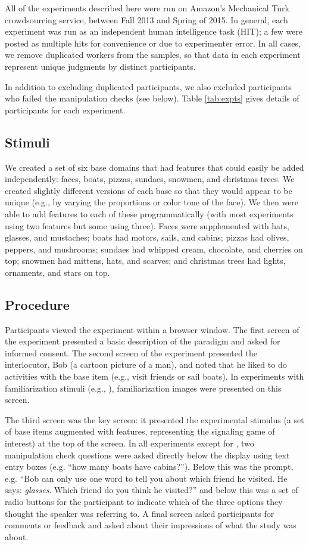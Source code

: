 All of the experiments described here were run on Amazon's Mechanical Turk crowdsourcing service, between Fall 2013 and Spring of 2015. In general, each experiment was run as an independent human intelligence task (HIT); a few were posted as multiple hits for convenience or due to experimenter error. In all cases, we remove duplicated workers from the samples, so that data in each experiment represent unique judgments by distinct participants. 

In addition to excluding duplicated participants, we also excluded participants who failed the manipulation checks (see below). Table \ref{tab:expts} gives details of participants for each experiment. 

\subsection{Stimuli}

We created a set of six base domains that had features that could easily be added independently: faces, boats, pizzas, sundaes, snowmen, and christmas trees. We created slightly different versions of each base so that they would appear to be unique (e.g., by varying the proportions or color tone of the face). We then were able to add features to each of these programmatically (with most experiments using two features but some using three). Faces were supplemented with hats, glasses, and mustaches; boats had motors, sails, and cabins; pizzas had olives, peppers, and mushrooms; sundaes had whipped cream, chocolate, and cherries on top; snowmen had mittens, hats, and scarves; and christmas trees had lights, ornaments, and stars on top.

\subsection{Procedure}

Participants viewed the experiment within a browser window. The first screen of the experiment presented a basic description of the paradigm and asked for informed consent. The second screen of the experiment presented the interlocutor, Bob (a cartoon picture of a man), and noted that he liked to do activities with the base item (e.g., visit friends or sail boats). In experiments with familiarization stimuli (e.g., ), familiarization images were presented on this screen. 

The third screen was the key screen: it presented the experimental stimulus (a set of base items augmented with features, representing the signaling game of interest) at the top of the screen. In all experiments except for , two manipulation check questions were asked directly below the display using text entry boxes (e.g. ``how many boats have cabins?''). Below this was the prompt, e.g. ``Bob can only use one word to tell you about which friend he visited. He says: {\it glasses}. Which friend do you think he visited?'' and below this was a set of radio buttons for the participant to indicate which of the three options they thought the speaker was referring to. A final screen asked participants for comments or feedback and asked about their impressions of what the study was about. 

